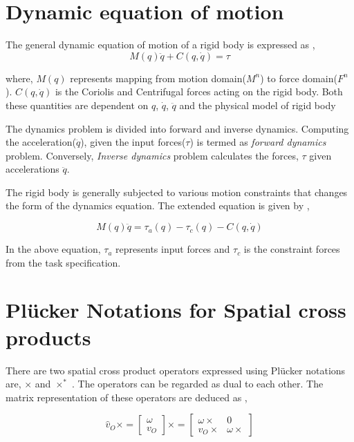 \chapter{Dynamic equation of motion}\label{chap:dynamic}
The general dynamic equation of motion of a rigid body is expressed as \cite{featherstone2014rigid} \cite{shakhimardanov2015composable}, 
\begin{equation}
	\label{eq:dynamic}
	M(q)\ddot{q} + C(q, \dot{q}) = \tau 
\end{equation}

where, $M(q)$ represents mapping from motion domain($M^n$) to force domain($F^n$). $C(q, \dot{q})$ is the Coriolis and Centrifugal forces acting on the rigid body. Both these quantities are dependent on $q$, $\dot{q}$, $\ddot{q}$ and the physical model of rigid body \cite{featherstone2014rigid}

The dynamics problem is divided into forward and inverse dynamics. Computing the acceleration($\ddot{q}$), given the input forces($\tau$) is termed as \textit{forward dynamics} problem. Conversely, \textit{Inverse dynamics} problem calculates the forces, $\tau$ given accelerations $\ddot{q}$.

The rigid body is generally subjected to various motion constraints that changes the form of the dynamics equation. The extended equation is given by \cite{shakhimardanov2015composable},

\begin{equation}
\label{eq:extendeddynamic}
M(q)\ddot{q} = \tau_a(q) - \tau_c(q) -  C(q, \dot{q})
\end{equation}

In the above equation, $\tau_a$ represents input forces and $\tau_c$ is the constraint forces from the task specification.


\chapter{Pl{\"u}cker Notations for Spatial cross products}\label{chap:cross}

There are two spatial cross product operators expressed using Pl{\"u}cker notations are, $\times$ and $\times^*$ \cite{featherstone2014rigid}. The operators can be regarded as dual to each other. The matrix representation of these operators are deduced as \cite{featherstone2014rigid},

	\begin{equation}
	\label{eq:cross1}
		\hat v_O \times = \begin{bmatrix}
			\omega \\ v_O
		\end{bmatrix} \times = \begin{bmatrix}
			\omega \times & 0 \\
			v_O \times & \omega \times
		\end{bmatrix}
	\end{equation}
	
